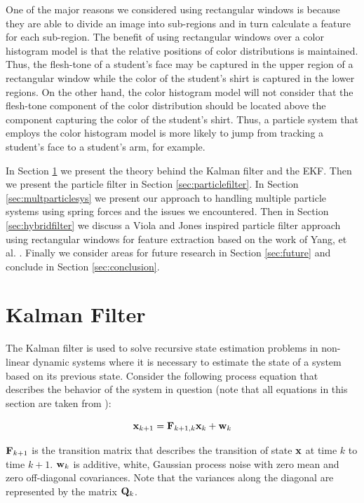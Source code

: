 \documentclass[11pt]{article}
\begin{document}
One of the major reasons we considered using rectangular windows is because they are able to divide an image into sub-regions and in turn calculate a feature for each sub-region. The benefit of using rectangular windows over a color histogram model is that the relative positions of color distributions is maintained. Thus, the flesh-tone of a student's face may be captured in the upper region of a rectangular window while the color of the student's shirt is captured in the lower regions. On the other hand, the color histogram model will not consider that the flesh-tone component of the color distribution should be located above the component capturing the color of the student's shirt. Thus, a particle system that employs the color histogram model is more likely to jump from tracking a student's face to a student's arm, for example.

In Section \ref{sec:kalmanfilter} we present the theory behind the Kalman filter and the EKF. Then we present the particle filter in Section \ref{sec:particlefilter}. In Section \ref{sec:multparticlesys} we present our approach to handling multiple particle systems using spring forces and the issues we encountered. Then in Section \ref{sec:hybridfilter} we discuss a Viola and Jones inspired particle filter approach using rectangular windows for feature extraction based on the work of Yang, et al. \cite{hybrid}. Finally we consider areas for future research in Section \ref{sec:future} and conclude in Section \ref{sec:conclusion}.
  


\section{Kalman Filter}
\label{sec:kalmanfilter}

The Kalman filter is used to solve recursive state estimation problems in non-linear dynamic systems where it is necessary to estimate the state of a system based on its previous state. Consider the following process equation that describes the behavior of the system in question (note that all equations in this section are taken from \cite{kalman}):

\begin{equation}
{\bf x}_{k+1} = {\bf F}_{k+1,k} {\bf x}_k + {\bf w}_k
\label{eq:process}
\end{equation}
\vspace{0.01cm}

${\bf F}_{k+1}$ is the transition matrix that describes the transition of state ${\bf x}$ at time $k$ to time $k + 1$. ${\bf w}_k$ is additive, white, Gaussian process noise with zero mean and zero off-diagonal covariances. Note that the variances along the diagonal are represented by the matrix ${\bf Q}_k$.
\end{document}
